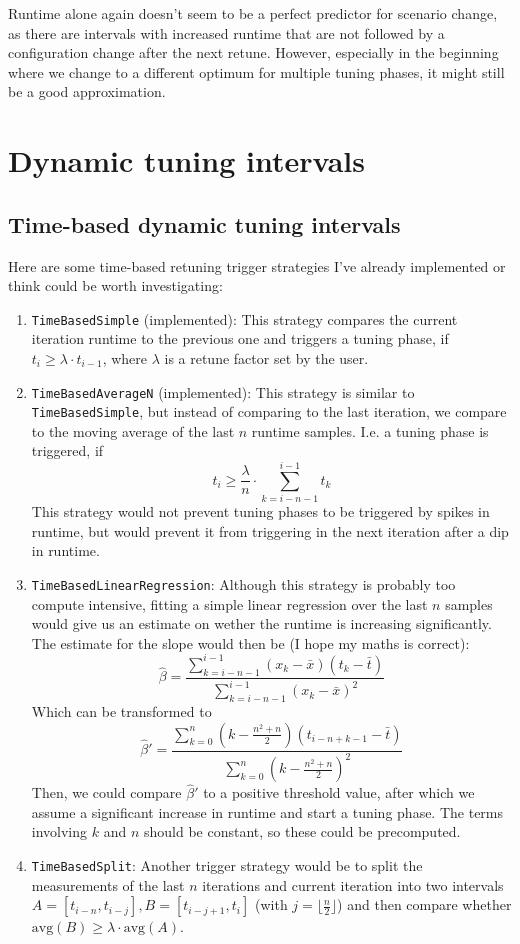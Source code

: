 \documentclass[]{article}
\begin{document}
Runtime alone again doesn't seem to be a perfect predictor for scenario change, as there are intervals with increased runtime that are not followed by a configuration change after the next retune. However, especially in the beginning where we change to a different optimum for multiple tuning phases, it might still be a good approximation.

\section{Dynamic tuning intervals}
\subsection{Time-based dynamic tuning intervals}
Here are some time-based retuning trigger strategies I've already implemented or think could be worth investigating:
\begin{enumerate}
	\item \texttt{TimeBasedSimple} (implemented):
	      This strategy compares the current iteration runtime to the previous one and triggers a tuning phase, if $t_i \ge \lambda\cdot t_{i-1}$, where $\lambda$ is a retune factor set by the user.
	\item \texttt{TimeBasedAverageN} (implemented):
	      This strategy is similar to \texttt{TimeBasedSimple}, but instead of comparing to the last iteration, we compare to the moving average of the last $n$ runtime samples. I.e. a tuning phase is triggered, if \[t_i \ge \frac{\lambda}{n}\cdot \sum_{k=i-n-1}^{i-1}t_{k}\]
	      This strategy would not prevent tuning phases to be triggered by spikes in runtime, but would prevent it from triggering in the next iteration after a dip in runtime.
	\item \texttt{TimeBasedLinearRegression}:
	      Although this strategy is probably too compute intensive, fitting a simple linear regression over the last $n$ samples would give us an estimate on wether the runtime is increasing significantly. The estimate for the slope would then be (I hope my maths is correct):
	      \[
		      \hat{\beta} =
		      \frac{\sum_{k=i-n-1}^{i-1}(x_k-\bar x)(t_k-\bar t)}{\sum_{k=i-n-1}^{i-1}(x_k-\bar x)^2}
	      \]
	      Which can be transformed to
	      \[
		      \hat\beta'  = \frac{\sum_{k=0}^{n}\left(k-\frac{n^2 +n}{2}\right)(t_{i-n+k-1}-\bar t)}{\sum_{k=0}^{n}\left(k-\frac{n^2 +n}{2}\right)^2}
	      \]
	      Then, we could compare $\hat\beta'$ to a positive threshold value, after which we assume a significant increase in runtime and start a tuning phase. The terms involving $k$ and $n$ should be constant, so these could be precomputed.
	\item \texttt{TimeBasedSplit}:
	      Another trigger strategy would be to split the measurements of the last $n$ iterations and current iteration into two intervals $A = [t_{i-n}, t_{i-j}], B=[t_{i-j+1},t_i]$ (with $j=\lfloor\frac{n}{2}\rfloor$) and then compare whether $\text{avg}(B)\ge \lambda\cdot \text{avg}(A)$.
\end{enumerate}
\end{document}
